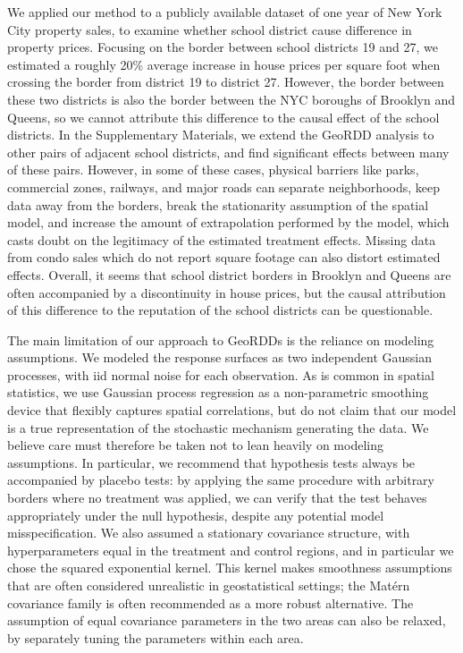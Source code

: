 We applied our method to a publicly available dataset of one year of New York City property sales, to examine whether school district cause difference in property prices.
Focusing on the border between school districts 19 and 27, we estimated a roughly 20\% average increase in house prices per square foot when crossing the border from district 19 to district 27.
However, the border between these two districts is also the border between the NYC boroughs of Brooklyn and Queens, so we cannot attribute this difference to the causal effect of the school districts.
In the Supplementary Materials, we extend the GeoRDD analysis to other pairs of adjacent school districts, and find significant effects between many of these pairs.
However, in some of these cases, physical barriers like parks, commercial zones, railways, and major roads can separate neighborhoods, keep data away from the borders, break the stationarity assumption of the spatial model, and increase the amount of extrapolation performed by the model, which casts doubt on the legitimacy of the estimated treatment effects.
Missing data from condo sales which do not report square footage can also distort estimated effects.
Overall, it seems that school district borders in Brooklyn and Queens are often accompanied by a discontinuity in house prices, but the causal attribution of this difference to the reputation of the school districts can be questionable.

The main limitation of our approach to GeoRDDs is the reliance on modeling assumptions.
We modeled the response surfaces as two independent Gaussian processes, with iid normal noise for each observation.
As is common in spatial statistics, we use Gaussian process regression as a non-parametric smoothing device that flexibly captures spatial correlations, but do not claim that our model is a true representation of the stochastic mechanism generating the data.
We believe care must therefore be taken not to lean heavily on modeling assumptions.
In particular, we recommend that hypothesis tests always be accompanied by placebo tests:
by applying the same procedure with arbitrary borders where no treatment was applied, we can verify that the test behaves appropriately under the null hypothesis, despite any potential model misspecification.
We also assumed a stationary covariance structure, with hyperparameters equal in the treatment and control regions, and in particular we chose the squared exponential kernel.
This kernel makes smoothness assumptions that are often considered unrealistic in geostatistical settings; the Mat\'ern covariance family is often recommended as a more robust alternative.
The assumption of equal covariance parameters in the two areas can also be relaxed, by separately tuning the parameters within each area.


